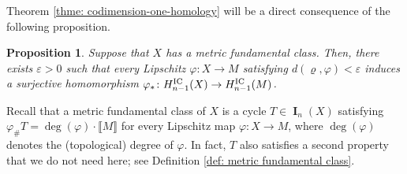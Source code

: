 \documentclass{amsart}
\newtheorem{proposition}[theorem]{Proposition}
\numberwithin{equation}{section}
\DeclareMathOperator{\bI}{\mathbf{I}}
\newcommand{\bb}[1]{\llbracket #1\rrbracket}
\begin{document}
        
    Theorem \ref{thme: codimension-one-homology} will be a direct consequence of the following proposition.

    \begin{proposition}\label{prop: induced-homo-integral-homology-codim-1}
        Suppose that $X$ has a metric fundamental class. Then, there exists $\varepsilon>0$ such that every Lipschitz $\varphi\colon X \to M$ satisfying $d(\varrho,\varphi) < \varepsilon$ induces a surjective homomorphism $\varphi_*\colon H_{n-1}^\textup{IC}(X)\to H_{n-1}^\textup{IC}(M)$. 
    \end{proposition}

    Recall that a metric fundamental class of $X$ is a cycle $T \in \bI_n(X)$ satisfying $\varphi_\#T = \deg(\varphi) \cdot \bb{M}$ for every Lipschitz map $\varphi\colon X \to M$, where $\deg(\varphi)$ denotes the (topological) degree of $\varphi$. In fact, $T$ also satisfies a second property that we do not need here; see Definition \ref{def: metric fundamental class}.
\end{document}
